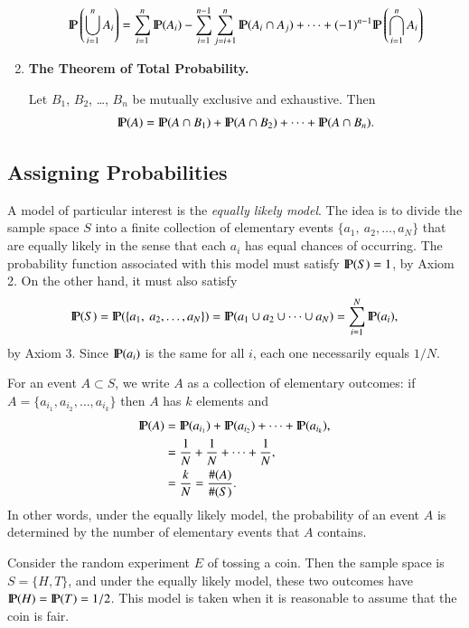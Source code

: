 \documentclass[captions=tableheading]{scrbook}
\begin{document}
\begin{enumerate}
  \begin{equation}
  \P\left(\bigcup_{i=1}^{n}A_{i}\right)=\sum_{i=1}^{n}\P(A_{i})-\sum_{i=1}^{n-1}\sum_{j=i+1}^{n}\P(A_{i}\cap A_{j})+\cdots+(-1)^{n-1}\P\left(\bigcap_{i=1}^{n}A_{i}\right)
  \end{equation}
\item \textbf{The Theorem of Total Probability.} 

  Let \(B_{1}\), \(B_{2}\), \ldots{}, \(B_{n}\) be mutually exclusive and exhaustive. Then
  \begin{equation}
  \P(A)=\P(A\cap B_{1})+\P(A\cap B_{2})+\cdots+\P(A\cap B_{n}).\label{eq:theorem-total-probability}
  \end{equation}
\end{enumerate}
\subsection{Assigning Probabilities}
\label{sec-3-4-3}


A model of particular interest is the \emph{equally likely model}. The idea is to divide the sample space \(S\) into a finite collection of elementary events \( \{ a_{1},\ a_{2}, \ldots, a_{N} \} \) that are equally likely in the sense that each \(a_{i}\) has equal chances of occurring. The probability function associated with this model must satisfy \(\P(S)=1\), by Axiom 2. On the other hand, it must also satisfy
\[
\P(S)=\P( \{ a_{1},\ a_{2},\ldots,a_{N} \} )=\P(a_{1}\cup a_{2}\cup\cdots\cup a_{N})=\sum_{i=1}^{N}\P(a_{i}),
\]
by Axiom 3. Since \(\P(a_{i})\) is the same for all \(i\), each one necessarily equals \(1/N\). 

For an event \(A\subset S\), we write \(A\) as a collection of elementary outcomes: if \( A = \{ a_{i_{1}}, a_{i_{2}}, \ldots, a_{i_{k}} \} \) then \(A\) has \(k\) elements and 
\begin{align*}
\P(A) & =\P(a_{i_{1}})+\P(a_{i_{2}})+\cdots+\P(a_{i_{k}}),\\
 & =\frac{1}{N}+\frac{1}{N}+\cdots+\frac{1}{N},\\  & =\frac{k}{N}=\frac{\#(A)}{\#(S)}.
\end{align*}
In other words, under the equally likely model, the probability of an event \(A\) is determined by the number of elementary events that \(A\) contains. 

\begin{example}
Consider the random experiment \(E\) of tossing a coin. Then the sample space is \(S=\{H,T\}\), and under the equally likely model, these two outcomes have \(\P(H)=\P(T)=1/2\). This model is taken when it is reasonable to assume that the coin is fair.
\end{example}
\end{document}
